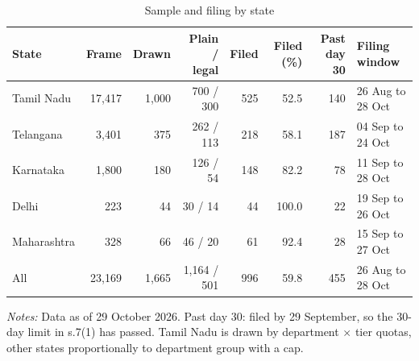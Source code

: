 \begin{table}[!htbp]
\centering
\caption{Sample and filing by state}
\label{tab:tab_sample}
\small
\begin{threeparttable}
\begin{tabular}{lrrrrrrl}
\toprule
State & Frame & Drawn & Plain / legal & Filed & Filed (\%) & Past day 30 & Filing window \\
\midrule
Tamil Nadu & 17,417 & 1,000 & 700 / 300 & 525 & 52.5 & 140 & 26 Aug to 28 Oct \\
Telangana & 3,401 & 375 & 262 / 113 & 218 & 58.1 & 187 & 04 Sep to 24 Oct \\
Karnataka & 1,800 & 180 & 126 / 54 & 148 & 82.2 & 78 & 11 Sep to 28 Oct \\
Delhi & 223 & 44 & 30 / 14 & 44 & 100.0 & 22 & 19 Sep to 26 Oct \\
Maharashtra & 328 & 66 & 46 / 20 & 61 & 92.4 & 28 & 15 Sep to 27 Oct \\
\midrule
All & 23,169 & 1,665 & 1,164 / 501 & 996 & 59.8 & 455 & 26 Aug to 28 Oct \\
\bottomrule
\end{tabular}
\begin{tablenotes}[flushleft]\footnotesize
\item \textit{Notes:} Data as of 29 October 2026. Past day 30: filed by 29 September, so the 30-day limit in s.7(1) has passed. Tamil Nadu is drawn by department $\times$ tier quotas, other states proportionally to department group with a cap.
\end{tablenotes}
\end{threeparttable}
\end{table}
